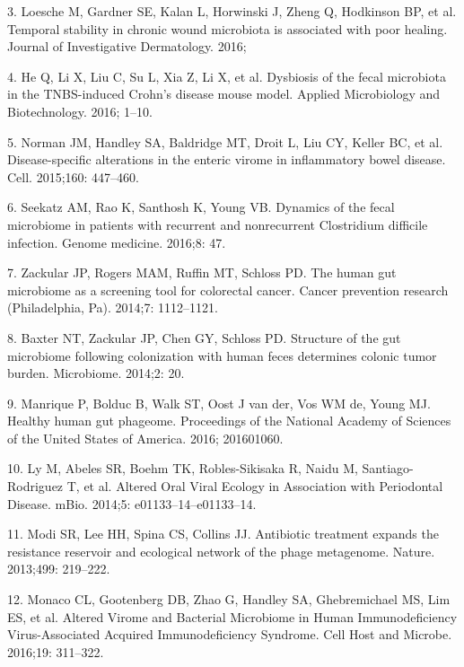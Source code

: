\documentclass[12pt,]{article}
\begin{document}
\hypertarget{ref-Loesche:2016ev}{}
3. Loesche M, Gardner SE, Kalan L, Horwinski J, Zheng Q, Hodkinson BP,
et al. Temporal stability in chronic wound microbiota is associated with
poor healing. Journal of Investigative Dermatology. 2016;

\hypertarget{ref-He:2016ch}{}
4. He Q, Li X, Liu C, Su L, Xia Z, Li X, et al. Dysbiosis of the fecal
microbiota in the TNBS-induced Crohn's disease mouse model. Applied
Microbiology and Biotechnology. 2016; 1--10.

\hypertarget{ref-Norman:2015kb}{}
5. Norman JM, Handley SA, Baldridge MT, Droit L, Liu CY, Keller BC, et
al. Disease-specific alterations in the enteric virome in inflammatory
bowel disease. Cell. 2015;160: 447--460.

\hypertarget{ref-Seekatz:2016fz}{}
6. Seekatz AM, Rao K, Santhosh K, Young VB. Dynamics of the fecal
microbiome in patients with recurrent and nonrecurrent Clostridium
difficile infection. Genome medicine. 2016;8: 47.

\hypertarget{ref-Zackular:2014fba}{}
7. Zackular JP, Rogers MAM, Ruffin MT, Schloss PD. The human gut
microbiome as a screening tool for colorectal cancer. Cancer prevention
research (Philadelphia, Pa). 2014;7: 1112--1121.

\hypertarget{ref-Baxter:2014hb}{}
8. Baxter NT, Zackular JP, Chen GY, Schloss PD. Structure of the gut
microbiome following colonization with human feces determines colonic
tumor burden. Microbiome. 2014;2: 20.

\hypertarget{ref-Manrique:2016dx}{}
9. Manrique P, Bolduc B, Walk ST, Oost J van der, Vos WM de, Young MJ.
Healthy human gut phageome. Proceedings of the National Academy of
Sciences of the United States of America. 2016; 201601060.

\hypertarget{ref-Ly:2014ew}{}
10. Ly M, Abeles SR, Boehm TK, Robles-Sikisaka R, Naidu M,
Santiago-Rodriguez T, et al. Altered Oral Viral Ecology in Association
with Periodontal Disease. mBio. 2014;5: e01133--14--e01133--14.

\hypertarget{ref-Modi:2013fia}{}
11. Modi SR, Lee HH, Spina CS, Collins JJ. Antibiotic treatment expands
the resistance reservoir and ecological network of the phage metagenome.
Nature. 2013;499: 219--222.

\hypertarget{ref-Monaco:2016ita}{}
12. Monaco CL, Gootenberg DB, Zhao G, Handley SA, Ghebremichael MS, Lim
ES, et al. Altered Virome and Bacterial Microbiome in Human
Immunodeficiency Virus-Associated Acquired Immunodeficiency Syndrome.
Cell Host and Microbe. 2016;19: 311--322.
\end{document}
